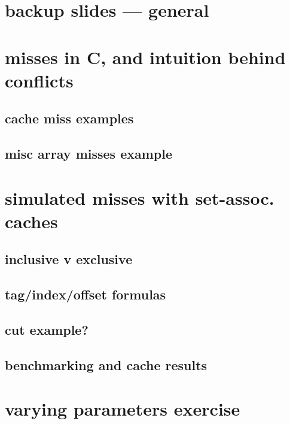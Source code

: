 
\section{backup slides --- general}

\section{misses in C, and intuition behind conflicts}


\subsection{cache miss examples}


\subsection{misc array misses example}


\section{simulated misses with set-assoc. caches}


\subsection{inclusive v exclusive}


\subsection{tag/index/offset formulas}


\subsection{cut example?}


\subsection{benchmarking and cache results}



\section{varying parameters exercise}


